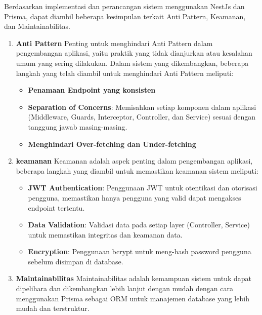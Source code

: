 Berdasarkan implementasi dan perancangan sistem menggunakan NestJs dan Prisma, dapat diambil beberapa kesimpulan terkait Anti Pattern, Keamanan, dan Maintainabilitas.
\begin{enumerate}
  \item \textbf{Anti Pattern}\newline
  Penting untuk menghindari Anti Pattern dalam pengembangan aplikasi, yaitu praktik yang tidak dianjurkan atau kesalahan umum yang sering dilakukan. Dalam sistem yang dikembangkan, beberapa langkah yang telah diambil untuk menghindari Anti Pattern meliputi:
  \begin{itemize}
    \item \textbf{Penamaan Endpoint yang konsisten}
    \item \textbf{Separation of Concerns}: Memisahkan setiap komponen dalam aplikasi (Middleware, Guards, Interceptor, Controller, dan Service) sesuai dengan tanggung jawab masing-masing.
    \item \textbf{Menghindari Over-fetching dan Under-fetching}
  \end{itemize}
  \item \textbf{keamanan}\newline
  Keamanan adalah aspek penting dalam pengembangan aplikasi, beberapa langkah yang diambil untuk memastikan keamanan sistem meliputi:
  \begin{itemize}
    \item \textbf{JWT Authentication}: Penggunaan JWT untuk otentikasi dan otorisasi pengguna, memastikan hanya pengguna yang valid dapat mengakses endpoint tertentu.
    \item \textbf{Data Validation}: Validasi data pada setiap layer (Controller, Service) untuk memastikan integritas dan keamanan data.
    \item \textbf{Encryption}: Penggunaan bcrypt untuk meng-hash password pengguna sebelum disimpan di database.
  \end{itemize}
  \item \textbf{Maintainabilitas}\newline
  Maintainabilitas adalah kemampuan sistem untuk dapat dipelihara dan dikembangkan lebih lanjut dengan mudah dengan cara menggunakan Prisma sebagai ORM untuk manajemen database yang lebih mudah dan terstruktur.
\end{enumerate}

